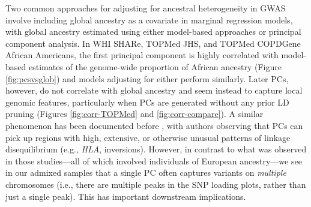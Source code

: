 \documentclass[12pt]{article}
\newcommand{\add}[1]{{\color{red}{[... #1 ...]}}}
\begin{document}
Two common approaches for adjusting for ancestral heterogeneity in GWAS involve including global ancestry as a covariate in marginal regression models, with global ancestry estimated using either model-based approaches or principal component analysis.
In WHI SHARe, TOPMed JHS, and TOPMed COPDGene African Americans, the first principal component is highly correlated with model-based estimates of the genome-wide proportion of African ancestry (Figure \ref{fig:pcsvsglob}) and models adjusting for either perform similarly.
Later PCs, however, do not correlate with global ancestry and seem instead to capture local genomic features, particularly when PCs are generated without any prior LD pruning (Figures \ref{fig:corr-TOPMed} and \ref{fig:corr-compare}).
A similar phenomenon has been documented before \add{CITE: Zou, Prive, Price?}, with authors observing that PCs can pick up regions with high, extensive, or otherwise unusual patterns of linkage disequilibrium (e.g., \textit{HLA}, inversions).
However, in contrast to what was observed in those studies---all of which involved individuals of European ancestry---we see in our admixed samples that a single PC often captures variants on \textit{multiple} chromosomes (i.e., there are multiple peaks in the SNP loading plots, rather than just a single peak).
This has important downstream implications.
\end{document}
